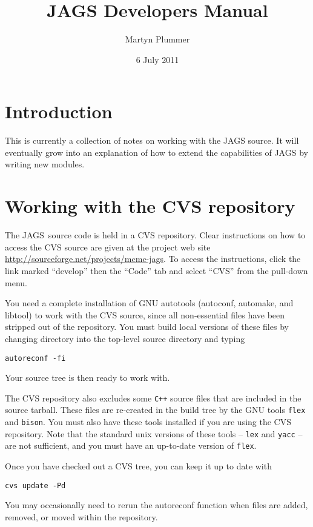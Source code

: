 \documentclass[11pt, a4paper, titlepage]{report}
\newcommand{\JAGS}{\textsf{JAGS}}
\begin{document}
\title{JAGS Developers Manual}
\author{Martyn Plummer}
\date{6 July 2011}
\maketitle

\tableofcontents

\chapter{Introduction}

This is currently a collection of notes on working with the JAGS
source. It will eventually grow into an explanation of how to extend
the capabilities of JAGS by writing new modules.

\chapter{Working with the CVS repository}

The \JAGS\ source code is held in a CVS repository.  Clear
instructions on how to access the CVS source are given at the project
web site \url{http://sourceforge.net/projects/mcmc-jags}. To access
the instructions, click the link marked ``develop'' then the ``Code''
tab and select ``CVS'' from the pull-down menu.

You need a complete installation of GNU autotools (autoconf, automake,
and libtool) to work with the CVS source, since all non-essential
files have been stripped out of the repository. You must build local
versions of these files by changing directory into the top-level
source directory and typing
\begin{verbatim}
autoreconf -fi
\end{verbatim}
Your source tree is then ready to work with.  

The CVS repository also excludes some \texttt{C++} source files that are
included in the source tarball. These files are re-created in the
build tree by the GNU tools \verb+flex+ and \verb+bison+. You must
also have these tools installed if you are using the CVS
repository. Note that the standard unix versions of these tools --
\verb+lex+ and \verb+yacc+ -- are not sufficient, and you must have an
up-to-date version of \verb+flex+.

Once you have checked out a CVS tree, you can keep it up to date with
\begin{verbatim}
cvs update -Pd
\end{verbatim}
You may occasionally need to rerun the autoreconf function when files
are added, removed, or moved within the repository.
\end{document}
